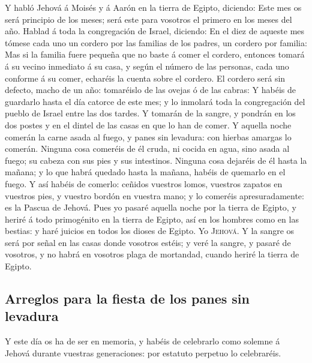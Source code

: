  Y habló Jehová á Moisés y á Aarón en la tierra de Egipto,
diciendo:  Este mes os será principio de los meses; será
este para vosotros el primero en los meses del año. 
Hablad á toda la congregación de Israel, diciendo: En el diez de aqueste
mes tómese cada uno un cordero por las familias de los padres, un
cordero por familia:  Mas si la familia fuere pequeña que
no baste á comer el cordero, entonces tomará á su vecino inmediato á su
casa, y según el número de las personas, cada uno conforme á su comer,
echaréis la cuenta sobre el cordero.  El cordero será sin
defecto, macho de un año: tomaréislo de las ovejas ó de las cabras:
 Y habéis de guardarlo hasta el día catorce de este mes; y
lo inmolará toda la congregación del pueblo de Israel entre las dos
tardes.  Y tomarán de la sangre, y pondrán en los dos
postes y en el dintel de las casas en que lo han de comer.
 Y aquella noche comerán la carne asada al fuego, y panes
sin levadura: con hierbas amargas lo comerán.  Ninguna
cosa comeréis de él cruda, ni cocida en agua, sino asada al fuego; su
cabeza con sus pies y sus intestinos.  Ninguna cosa
dejaréis de él hasta la mañana; y lo que habrá quedado hasta la mañana,
habéis de quemarlo en el fuego.  Y así habéis de comerlo:
ceñidos vuestros lomos, vuestros zapatos en vuestros pies, y vuestro
bordón en vuestra mano; y lo comeréis apresuradamente: es la Pascua de
Jehová.  Pues yo pasaré aquella noche por la tierra de
Egipto, y heriré á todo primogénito en la tierra de Egipto, así en los
hombres como en las bestias: y haré juicios en todos los dioses de
Egipto. Yo \textsc{Jehová}.  Y la sangre os será por
señal en las casas donde vosotros estéis; y veré la sangre, y pasaré de
vosotros, y no habrá en vosotros plaga de mortandad, cuando heriré la
tierra de Egipto.

\hypertarget{arreglos-para-la-fiesta-de-los-panes-sin-levadura}{%
\subsection{Arreglos para la fiesta de los panes sin
levadura}\label{arreglos-para-la-fiesta-de-los-panes-sin-levadura}}

 Y este día os ha de ser en memoria, y habéis de
celebrarlo como solemne á Jehová durante vuestras generaciones: por
estatuto perpetuo lo celebraréis.

